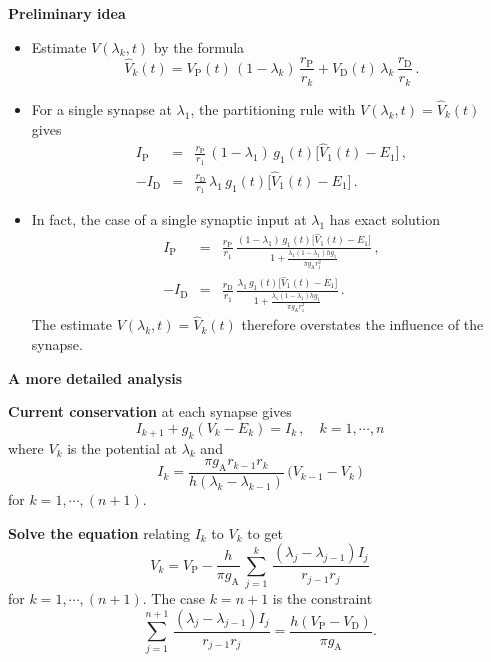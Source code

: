 \documentclass{slides}
\def\ds{\displaystyle}
\begin{document}
%
%
\begin{slide}
\begin{center}
\textbf{Preliminary idea}
\end{center}
\begin{itemize}
\item
Estimate $V(\lambda_k,t)$ by the formula
\[
\widehat{V}_k(t)=V_\mathrm{P}(t)\,(1-\lambda_k)\,
\frac{r_\mathrm{P}}{r_k}+V_\mathrm{D}(t)\,\lambda_k\,
\frac{r_\mathrm{D}}{r_k}\,.
\]

\item For a single synapse at $\lambda_1$, the partitioning rule
with $V(\lambda_k,t)=\widehat{V}_k(t)$ gives
\[
\begin{array}{rcl}
I_\mathrm{P} & = &\ds \frac{r_\mathrm{P}}{r_1}\,(1-\lambda_1)\,g_1(t)
\Bigg[\widehat{V}_1(t)-E_1\Bigg]\,,\\[25pt]
-I_\mathrm{D} & = & \ds\frac{r_\mathrm{D}}{r_1}\,\lambda_1\,g_1(t)
\Bigg[\widehat{V}_1(t)-E_1\Bigg]\,.
\end{array}
\]

\item
In fact, the case of a single synaptic input at $\lambda_1$ has
exact solution
\[
\begin{array}{rcl}
I_\mathrm{P} & = & \ds\frac{r_\mathrm{P}}{r_1}\,
\frac{(1-\lambda_1)\,g_1(t)\Bigg[\widehat{V}_1(t)-E_1\Bigg]}
{1+\frac{\lambda_1(1-\lambda_1 )h g_1}{\pi g_\mathrm{A}
r^2_1}}\,,\\[35pt]
-I_\mathrm{D} & = &\ds\frac{r_\mathrm{D}}{r_1}\,
\frac{\lambda_1\,g_1(t)\Bigg[\widehat{V}_1(t)-E_1\Bigg]}
{1+\frac{\lambda_1(1-\lambda_1 )h g_1}{\pi g_\mathrm{A} r^2_1}}\,.
\end{array}
\]
The estimate $V(\lambda_k,t)=\widehat{V}_k(t)$ therefore
overstates the influence of the synapse.
\end{itemize}
\end{slide}

%
%
\begin{slide}
\begin{center}
\textbf{A more detailed analysis}
\end{center}
\textbf{Current conservation} at each synapse gives
\[
I_{k+1}+g_k(V_k-E_k) = I_k\,,\quad k=1,\cdots,n
\]
where $V_k$ is the potential at $\lambda_k$ and
\[
I_k = \frac{\pi g_\mathrm{A}r_{k-1}r_k}
{h(\lambda_k-\lambda_{k-1})}\,\big(V_{k-1}-V_k\,\big)
\]
for $k=1,\cdots,(n+1)$.

\vfil

\textbf{Solve the equation} relating $I_k$ to $V_k$ to get
\[
V_k = V_\mathrm{P} -\frac{h}{\pi g_\mathrm{A}}\,\sum_{j=1}^k \,
\frac{(\lambda_j-\lambda_{j-1})I_j}{r_{j-1}r_j}
\]
for $k=1,\cdots,(n+1)$. The case $k=n+1$ is the constraint
\[
\sum_{j=1}^{n+1} \,
\frac{(\lambda_j-\lambda_{j-1})I_j}{r_{j-1}r_j}=
\frac{h(V_\mathrm{P}-V_\mathrm{D})}{\pi g_\mathrm{A}}.
\]
\end{slide}
\end{document}
